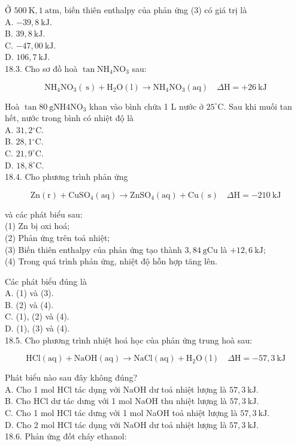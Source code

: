 \documentclass[10pt]{article}
\begin{document}
Ở $500 \mathrm{~K}, 1 \mathrm{~atm}$, biến thiên enthalpy của phản ứng (3) có giá trị là\\
A. $-39,8 \mathrm{~kJ}$.\\
B. $39,8 \mathrm{~kJ}$.\\
C. $-47,00 \mathrm{~kJ}$.\\
D. $106,7 \mathrm{~kJ}$.\\
18.3. Cho sơ đồ hoà $\tan \mathrm{NH}_{4} \mathrm{NO}_{3}$ sau:

$$
\mathrm{NH}_{4} \mathrm{NO}_{3}(\mathrm{~s})+\mathrm{H}_{2} \mathrm{O}(\mathrm{l}) \rightarrow \mathrm{NH}_{4} \mathrm{NO}_{3}(\mathrm{aq}) \quad \Delta \mathrm{H}=+26 \mathrm{~kJ}
$$

Hoà $\tan 80 \mathrm{~g} \mathrm{NH} 4 \mathrm{NO}_{3}$ khan vào bình chứa 1 L nước ở $25^{\circ} \mathrm{C}$. Sau khi muối tan hết, nước trong bình có nhiệt độ là\\
A. $31,2{ }^{\circ} \mathrm{C}$.\\
B. $28,1{ }^{\circ} \mathrm{C}$.\\
C. $21,9^{\circ} \mathrm{C}$.\\
D. $18,8^{\circ} \mathrm{C}$.\\
18.4. Cho phương trình phản ứng

$$
\mathrm{Zn}(\mathrm{r})+\mathrm{CuSO}_{4}(\mathrm{aq}) \rightarrow \mathrm{ZnSO}_{4}(\mathrm{aq})+\mathrm{Cu}(\mathrm{~s}) \quad \Delta \mathrm{H}=-210 \mathrm{~kJ}
$$

và các phát biểu sau:\\
(1) Zn bị oxi hoá;\\
(2) Phản ứng trên toả nhiệt;\\
(3) Biến thiên enthalpy của phản ứng tạo thành $3,84 \mathrm{~g} \mathrm{Cu}$ là $+12,6 \mathrm{~kJ}$;\\
(4) Trong quá trình phản ứng, nhiệt độ hỗn hợp tăng lên.

Các phát biểu đúng là\\
A. (1) và (3).\\
B. (2) và (4).\\
C. (1), (2) và (4).\\
D. (1), (3) và (4).\\
18.5. Cho phương trình nhiệt hoá học của phản ứng trung hoà sau:

$$
\mathrm{HCl}(\mathrm{aq})+\mathrm{NaOH}(\mathrm{aq}) \rightarrow \mathrm{NaCl}(\mathrm{aq})+\mathrm{H}_{2} \mathrm{O}(\mathrm{l}) \quad \Delta \mathrm{H}=-57,3 \mathrm{~kJ}
$$

Phát biểu nào sau đây không đúng?\\
A. Cho 1 mol HCl tác dụng với NaOH dư toả nhiệt lượng là $57,3 \mathrm{~kJ}$.\\
B. Cho HCl dư tác dưng với 1 mol NaOH thu nhiệt lượng là $57,3 \mathrm{~kJ}$.\\
C. Cho 1 mol HCl tác dưng với 1 mol NaOH toả nhiệt lượng là $57,3 \mathrm{~kJ}$.\\
D. Cho 2 mol HCl tác dụng với NaOH dư toả nhiệt lượng là $57,3 \mathrm{~kJ}$.\\
18.6. Phản ứng đốt cháy ethanol:
\end{document}
